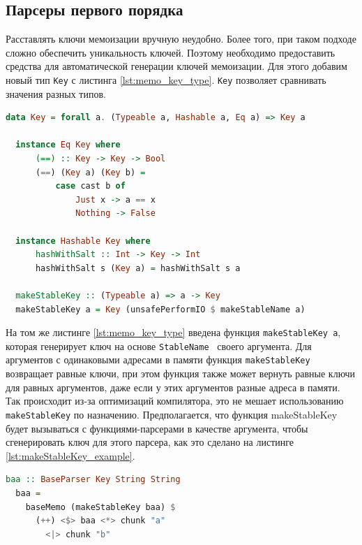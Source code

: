 \documentclass[times]{itmo-student-thesis}
\begin{document}
\subsection{Парсеры первого порядка}

Расставлять ключи мемоизации вручную неудобно. Более того, при таком подходе сложно обеспечить уникальность ключей. Поэтому
необходимо предоставить средства для автоматической генерации ключей мемоизации. Для этого добавим новый тип \lstinline{Key} 
с листинга \ref{lst:memo_key_type}. \lstinline{Key} позволяет сравнивать значения разных типов. 

\begin{lstlisting}[language=Haskell,float=!h,caption={Тип ключей мемоизации},label={lst:memo_key_type}]
  data Key = forall a. (Typeable a, Hashable a, Eq a) => Key a

  instance Eq Key where
      (==) :: Key -> Key -> Bool
      (==) (Key a) (Key b) =
          case cast b of
              Just x -> a == x
              Nothing -> False

  instance Hashable Key where
      hashWithSalt :: Int -> Key -> Int
      hashWithSalt s (Key a) = hashWithSalt s a

  makeStableKey :: (Typeable a) => a -> Key
  makeStableKey a = Key (unsafePerformIO $ makeStableName a)
\end{lstlisting}

На том же листинге \ref{lst:memo_key_type} введена функция \lstinline{makeStableKey a}, которая генерирует ключ на основе
\lstinline{StableName}~\cite{noauthor_systemmemstablename_nodate}
своего аргумента. Для аргументов с одинаковыми адресами в памяти функция \lstinline{makeStableKey} возвращает равные ключи,
при этом функция также может вернуть равные ключи для равных аргументов, даже если у этих аргументов разные адреса в
памяти. Так происходит из-за оптимизаций компилятора, это не мешает использованию \lstinline{makeStableKey} по назначению.
Предполагается, что функция makeStableKey будет вызываться с функциями-парсерами в качестве аргумента, чтобы
сгенерировать ключ для этого парсера, как это сделано на листинге \ref{lst:makeStableKey_example}.

\begin{lstlisting}[language=Haskell,float=!h,caption={Пример использования makeStableKey},label={lst:makeStableKey_example}]
  baa :: BaseParser Key String String
  baa =
    baseMemo (makeStableKey baa) $
      (++) <$> baa <*> chunk "a"
        <|> chunk "b"
\end{lstlisting}
\end{document}
